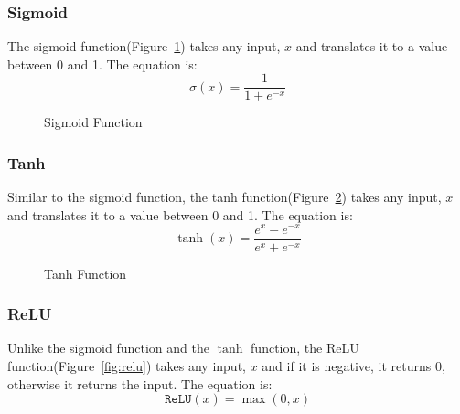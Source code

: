 \documentclass[titlepage]{article}
\begin{document}
\subsubsection{Sigmoid}
The sigmoid function(Figure~\ref{fig:sigmoid_function}) takes any input, $x$ and translates it to a value between 0 and 1. The equation is:
\begin{equation}
    \sigma(x) = \frac{1}{1 + e^{-x}}
    \label{eq:sigmoid}
\end{equation}
\begin{figure}[h!]
    \begin{center}
    \end{center}
    \caption{Sigmoid Function}    
    \label{fig:sigmoid_function}
\end{figure}


\subsubsection{Tanh}
Similar to the sigmoid function, the tanh function(Figure~\ref{fig:tanh}) takes any input, $x$ and translates it to a value between 0 and 1. The equation is:
\begin{equation}
    \tanh(x) = \frac{e^{x} - e^{-x}}{e^{x} + e^{-x}}
    \label{eq:tanh}
\end{equation}
\begin{figure}[h!]
    \begin{center}
    \end{center}
    \label{fig:tanh}
    \caption{Tanh Function}    
\end{figure}


\subsubsection{ReLU}
Unlike the sigmoid function and the $\tanh$ function, the ReLU function(Figure~\ref{fig:relu}) takes any input, $x$ and if it is negative, it returns 0, otherwise it returns the input. The equation is:
\begin{equation}
    \texttt{ReLU}(x) = \max(0, x)
    \label{eq:relu}
\end{equation}
\end{document}
